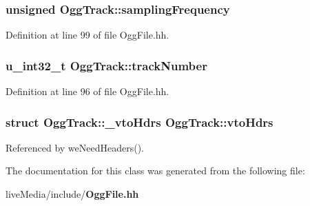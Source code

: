 \subsubsection[{sampling\+Frequency}]{\setlength{\rightskip}{0pt plus 5cm}unsigned Ogg\+Track\+::sampling\+Frequency}\label{classOggTrack_a43ee4a0122fdd2ec780b16ffcdf8ba5c}


Definition at line 99 of file Ogg\+File.\+hh.

\subsubsection[{track\+Number}]{\setlength{\rightskip}{0pt plus 5cm}u\+\_\+int32\+\_\+t Ogg\+Track\+::track\+Number}\label{classOggTrack_a24dd3946fe5b0b52a867fbf09e5b4290}


Definition at line 96 of file Ogg\+File.\+hh.

\subsubsection[{vto\+Hdrs}]{\setlength{\rightskip}{0pt plus 5cm}struct {\bf Ogg\+Track\+::\+\_\+vto\+Hdrs}  Ogg\+Track\+::vto\+Hdrs}\label{classOggTrack_ab4954d9f580f246e483c130baf39da59}


Referenced by we\+Need\+Headers().



The documentation for this class was generated from the following file\+:\begin{DoxyCompactItemize}
\item 
live\+Media/include/{\bf Ogg\+File.\+hh}\end{DoxyCompactItemize}
